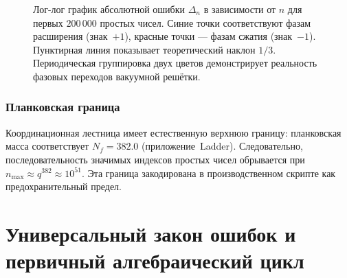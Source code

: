 \documentclass[12pt,a4paper]{article}
\theoremstyle{remark}
\begin{document}
	\begin{figure}[htbp]
		\centering
		\caption{Лог-лог график абсолютной ошибки \(\Delta_n\) в зависимости от \(n\) для первых
			\(200\,000\) простых чисел. Синие точки соответствуют фазам расширения (знак~\(+1\)),
			красные точки --- фазам сжатия (знак~\(-1\)). Пунктирная линия показывает
			теоретический наклон \(1/3\). Периодическая группировка двух цветов
			демонстрирует реальность фазовых переходов вакуумной решётки.}
		\label{fig:loglog}
	\end{figure}
	
	\subsubsection{Планковская граница}
	
	Координационная лестница имеет естественную верхнюю границу: планковская масса соответствует \(N_f = 382.0\) (приложение~Ladder). Следовательно, последовательность значимых индексов простых чисел обрывается при \(n_{\max} \approx q^{382} \approx 10^{51}\). Эта граница закодирована в производственном скрипте как предохранительный предел.
	
	\section{Универсальный закон ошибок и первичный алгебраический цикл}
	\label{sec:error-law}
	
\end{document}

